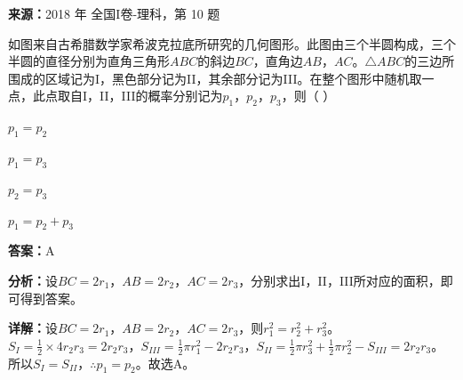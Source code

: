\begin{question}[points=5]
\textbf{来源：}2018 年 全国I卷-理科，第 10 题\par
如图来自古希腊数学家希波克拉底所研究的几何图形。此图由三个半圆构成，三个半圆的直径分别为直角三角形$ABC$的斜边$BC$，直角边$AB$，$AC$。$\triangle ABC$的三边所围成的区域记为I，黑色部分记为II，其余部分记为III。在整个图形中随机取一点，此点取自I，II，III的概率分别记为$p_1$，$p_2$，$p_3$，则（    ）
\begin{choices}
  \item $p_1=p_2$
  \item $p_1=p_3$
  \item $p_2=p_3$
  \item $p_1=p_2+p_3$
\end{choices}
\begin{solution}
\textbf{答案：}A

\textbf{分析：}设$BC=2r_1$，$AB=2r_2$，$AC=2r_3$，分别求出I，II，III所对应的面积，即可得到答案。

\textbf{详解：}设$BC=2r_1$，$AB=2r_2$，$AC=2r_3$，则$r_1^2=r_2^2+r_3^2$。$S_I=\frac{1}{2}\times4r_2r_3=2r_2r_3$，$S_{III}=\frac{1}{2}\pi r_1^2-2r_2r_3$，$S_{II}=\frac{1}{2}\pi r_3^2+\frac{1}{2}\pi r_2^2-S_{III}=2r_2r_3$。所以$S_I=S_{II}$，$\therefore p_1=p_2$。故选A。
\end{solution}
\end{question}

